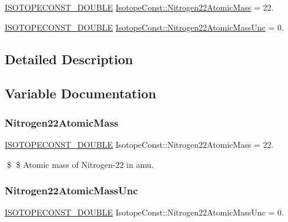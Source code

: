 \begin{DoxyCompactItemize}
\item 
\mbox{\hyperlink{group___isotope_const-_macros_ga8f45a7272ce02c0b4c65c44636ed719a}{I\+S\+O\+T\+O\+P\+E\+C\+O\+N\+S\+T\+\_\+\+D\+O\+U\+B\+LE}} \mbox{\hyperlink{group___isotope_const-_nitrogen-_n22_ga77e4ec78c6b24b16cd4201cc57267cb5}{Isotope\+Const\+::\+Nitrogen22\+Atomic\+Mass}} = 22.
\item 
\mbox{\hyperlink{group___isotope_const-_macros_ga8f45a7272ce02c0b4c65c44636ed719a}{I\+S\+O\+T\+O\+P\+E\+C\+O\+N\+S\+T\+\_\+\+D\+O\+U\+B\+LE}} \mbox{\hyperlink{group___isotope_const-_nitrogen-_n22_gaedc8b21ff45c6ad651f8394d8f9c55dc}{Isotope\+Const\+::\+Nitrogen22\+Atomic\+Mass\+Unc}} = 0.
\end{DoxyCompactItemize}


\subsection{Detailed Description}


\subsection{Variable Documentation}
\mbox{\label{group___isotope_const-_nitrogen-_n22_ga77e4ec78c6b24b16cd4201cc57267cb5}} 
\subsubsection{\texorpdfstring{Nitrogen22\+Atomic\+Mass}{Nitrogen22AtomicMass}}
{\footnotesize\ttfamily \mbox{\hyperlink{group___isotope_const-_macros_ga8f45a7272ce02c0b4c65c44636ed719a}{I\+S\+O\+T\+O\+P\+E\+C\+O\+N\+S\+T\+\_\+\+D\+O\+U\+B\+LE}} Isotope\+Const\+::\+Nitrogen22\+Atomic\+Mass = 22.}

\$ \$ Atomic mass of Nitrogen-\/22 in amu. \mbox{\label{group___isotope_const-_nitrogen-_n22_gaedc8b21ff45c6ad651f8394d8f9c55dc}} 
\subsubsection{\texorpdfstring{Nitrogen22\+Atomic\+Mass\+Unc}{Nitrogen22AtomicMassUnc}}
{\footnotesize\ttfamily \mbox{\hyperlink{group___isotope_const-_macros_ga8f45a7272ce02c0b4c65c44636ed719a}{I\+S\+O\+T\+O\+P\+E\+C\+O\+N\+S\+T\+\_\+\+D\+O\+U\+B\+LE}} Isotope\+Const\+::\+Nitrogen22\+Atomic\+Mass\+Unc = 0.}

